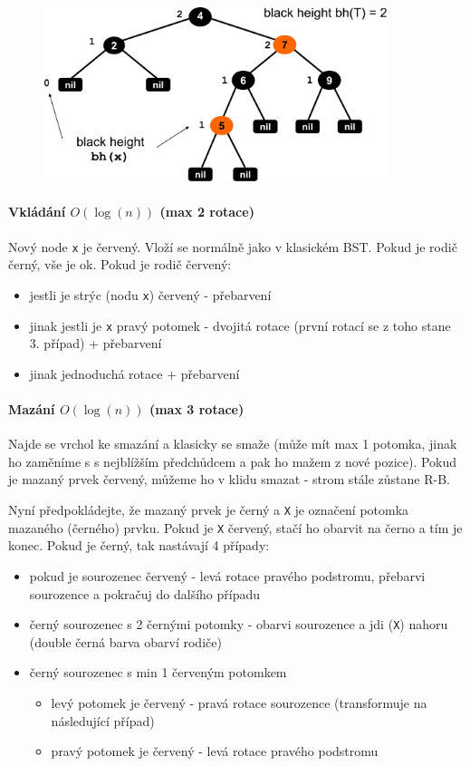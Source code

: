 \begin{figure}[h]
    \begin{center}
        \includegraphics[width=100mm]{03/images/red-black}
    \end{center}
\end{figure}

\paragraph{Vkládání $O(\log(n))$ (max 2 rotace)} Nový node \texttt{x} je červený. Vloží se normálně jako v klasickém BST. Pokud je rodič černý, vše je ok. Pokud je rodič červený:

\begin{itemize}
\item jestli je strýc (nodu \texttt{x}) červený - přebarvení
\item jinak jestli je \texttt{x} pravý potomek  - dvojitá rotace (první rotací se z toho stane 3. případ) + přebarvení
\item jinak jednoduchá rotace + přebarvení
\end{itemize}

\paragraph{Mazání $O(\log(n))$ (max 3 rotace)} Najde se vrchol ke smazání a klasicky se smaže (může mít max 1 potomka, jinak ho zaměníme s s nejblížším předchůdcem a pak ho mažem z nové pozice). Pokud je mazaný prvek červený, můžeme ho v klidu smazat - strom stále zůstane R-B.

Nyní předpokládejte, že mazaný prvek je černý a \texttt{X} je označení potomka mazaného (černého) prvku. Pokud je \texttt{X} červený, stačí ho obarvit na černo a tím je konec. Pokud je černý, tak nastávají 4 případy:

\begin{itemize}
\item pokud je sourozenec červený - levá rotace pravého podstromu, přebarvi sourozence a pokračuj do dalšího případu
\item černý sourozenec s 2 černými potomky - obarvi sourozence a jdi (\texttt{X}) nahoru (double černá barva obarví rodiče)
\item černý sourozenec s min 1 červeným potomkem
\begin{itemize}
\item levý potomek je červený - pravá rotace sourozence (transformuje na následující případ)
\item pravý potomek je červený - levá rotace pravého podstromu
\end{itemize}
\end{itemize}


